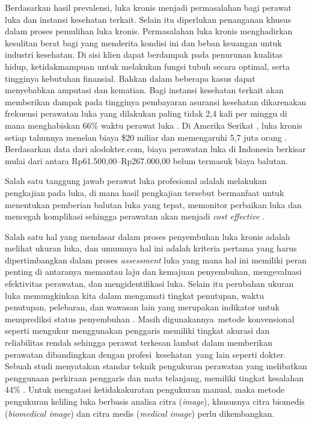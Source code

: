 Berdasarkan hasil prevalensi, luka kronis menjadi permasalahan bagi perawat luka dan instansi kesehatan terkait. Selain itu diperlukan penanganan khusus dalam proses pemulihan luka kronis. Permasalahan luka kronis menghadirkan kesulitan berat bagi yang menderita kondisi ini dan beban keuangan untuk industri kesehatan. Di sisi klien dapat berdampak pada penurunan kualitas hidup, ketidakmampuan untuk melakukan fungsi tubuh secara optimal, serta tingginya kebutuhan finansial. Bahkan dalam beberapa kasus dapat menyebabkan amputasi dan kematian. Bagi instansi kesehatan terkait akan memberikan dampak pada tingginya pembayaran asuransi kesehatan dikarenakan frekuensi perawatan luka yang dilakukan paling tidak 2,4 kali per minggu di mana menghabiskan 66\% waktu perawat luka \citep{HSE2007:8}. Di Amerika Serikat , luka kronis setiap tahunnya menelan biaya \$20 miliar dan memengaruhi 5,7 juta orang \citep{brown2018wearable:9}. Berdasarkan data dari alodokter.com, biaya perawatan luka di Indonesia berkisar mulai dari antara Rp61.500,00–Rp267.000,00 belum termasuk biaya balutan. %

Salah satu tanggung jawab perawat luka profesional adalah melakukan pengkajian pada luka, di mana hasil pengkajian tersebut bermanfaat untuk menentukan pemberian balutan luka yang tepat, memonitor perbaikan luka dan mencegah komplikasi sehingga perawatan akan menjadi \emph{cost effective} \citep{benbow2016best:10}. %

Salah satu hal yang mendasar dalam proses penyembuhan luka kronis adalah melihat ukuran luka, dan umumnya hal ini adalah kriteria pertama yang harus dipertimbangkan dalam proses \emph{assessment} luka yang mana hal ini memiliki peran penting di antaranya memantau laju dan kemajuan penyembuhan, mengevaluasi efektivitas perawatan, dan mengidentifikasi luka. Selain itu perubahan ukuran luka memungkinkan kita dalam mengamati tingkat penutupan, waktu penutupan, pelebaran, dan wawasan lain yang merupakan indikator untuk memprediksi status penyembuhan \citep{carrion2022automatic}. Masih digunakannya metode konvensional seperti mengukur menggunakan penggaris memiliki tingkat akurasi dan reliabilitas rendah sehingga perawat terkesan lambat dalam memberikan perawatan dibandingkan dengan profesi kesehatan yang lain seperti dokter. Sebuah studi menyatakan standar teknik pengukuran perawatan yang melibatkan penggunaan perkiraan penggaris dan mata telanjang, memiliki tingkat kesalahan 44\% \citep{budman2015design:11}. Untuk mengatasi ketidakakuratan pengukuran manual, maka metode pengukuran keliling luka berbasis analisa citra (\emph{image}), khususnya citra biomedis (\emph{biomedical image}) dan citra medis (\emph{medical image}) perlu dikembangkan. %

